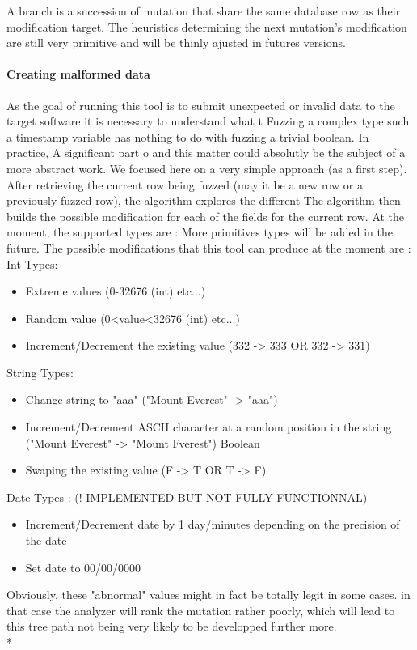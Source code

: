\documentclass{article}
\begin{document}
\begin{empfile}
\begin{itemize}
				\end{itemize}
A branch is a succession of mutation that share the same database row as their modification target.
The heuristics determining the next mutation's modification are still very primitive and will be thinly ajusted in futures versions.								 
				\paragraph{Creating malformed data} 
As the goal of running this tool is to submit unexpected or invalid data to the target software it is necessary to understand what t
Fuzzing a complex type such a timestamp variable has nothing to do with fuzzing a trivial boolean. In practice, A significant part o
and this matter could absolutly be the subject of a more abstract work. We focused here on a very simple approach (as a first step).
After retrieving the current row being fuzzed (may it be a new row or a previously fuzzed row), the algorithm explores the different
The algorithm then builds the possible modification for each of the fields for the current row.
At the moment, the supported types are : %
More primitives types will be added in the future.
The possible modifications that this tool can produce at the moment are : %
				Int Types:
				\begin{itemize}
		
					\item Extreme values (0-32676 (int) etc...)
					\item Random value (0<value<32676 (int) etc...)
					\item Increment/Decrement the existing value (332 -> 333 OR 332 -> 331)
				\end{itemize}
				String Types:
				\begin{itemize}
			
					\item Change string to "aaa" ("Mount Everest" -> "aaa")
					\item Increment/Decrement ASCII character at a random position in the string ("Mount Everest" -> "Mount Fverest")
					Boolean
					\item Swaping the existing value (F -> T OR T -> F)
					\end{itemize}
					Date Types : (! IMPLEMENTED BUT NOT FULLY FUNCTIONNAL)					
					\begin{itemize}
					\item Increment/Decrement date by 1 day/minutes depending on the precision of the date
					\item Set date to 00/00/0000
				\end{itemize}
Obviously, these "abnormal" values might in fact be totally legit in some cases. in that case the analyzer 
will rank the mutation rather poorly, which will lead to this tree path not being very likely to be developped further more.
				\\*

\end{empfile}
\end{document}
